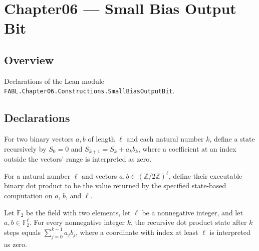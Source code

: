 \chapter{Chapter06 — Small Bias Output Bit}
\section{Overview}

Declarations of the Lean module \texttt{FABL.Chapter06.Constructions.SmallBiasOutputBit}.

\section{Declarations}

\begin{definition}
\label{FABL.executableBinaryDotProductState}
\leanok
{}
For two binary vectors $a,b$ of length $\ell$ and each natural number $k$, define a state
recursively by $S_0=0$ and $S_{k+1}=S_k+a_kb_k$, where a coefficient at an index outside
the vectors' range is interpreted as zero.
\end{definition}

\begin{definition}
\label{FABL.executableBinaryDotProduct}
\leanok
{}
For a natural number $\ell$ and vectors $a,b\in(\mathbb{Z}/2\mathbb{Z})^\ell$, define
their executable binary dot product to be the value returned by the specified
state-based computation on $a$, $b$, and $\ell$.
\end{definition}

\begin{theorem}
\label{FABL.executableBinaryDotProductState_eq_sum}
\leanok
{}
Let $\mathbb{F}_2$ be the field with two elements, let $\ell$ be a nonnegative integer,
and let $a,b\in\mathbb{F}_2^\ell$. For every nonnegative integer $k$, the recursive dot
product state after $k$ steps equals $\sum_{j=0}^{k-1} a_jb_j$, where a coordinate with
index at least $\ell$ is interpreted as zero.
\end{theorem}

